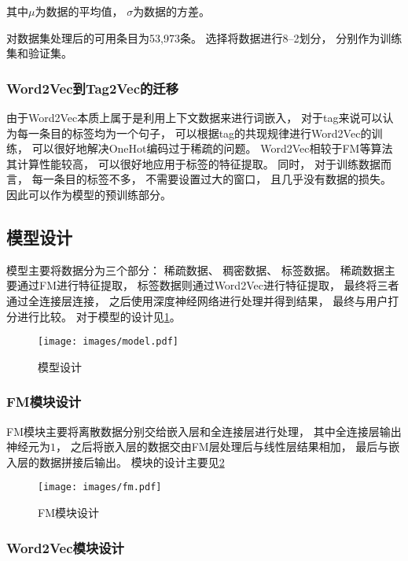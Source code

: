 其中$\mu$为数据的平均值，
$\sigma$为数据的方差。

对数据集处理后的可用条目为53,973条。
选择将数据进行8--2划分，
分别作为训练集和验证集。

\subsubsection{Word2Vec到Tag2Vec的迁移}

由于Word2Vec本质上属于是利用上下文数据来进行词嵌入，
对于tag来说可以认为每一条目的标签均为一个句子，
可以根据tag的共现规律进行Word2Vec的训练，
可以很好地解决OneHot编码过于稀疏的问题。
Word2Vec相较于FM等算法其计算性能较高，
可以很好地应用于标签的特征提取。
同时，
对于训练数据而言，
每一条目的标签不多，
不需要设置过大的窗口，
且几乎没有数据的损失。
因此可以作为模型的预训练部分。

\subsection{模型设计}

模型主要将数据分为三个部分：
稀疏数据、
稠密数据、
标签数据。
稀疏数据主要通过FM进行特征提取，
标签数据则通过Word2Vec进行特征提取，
最终将三者通过全连接层连接，
之后使用深度神经网络进行处理并得到结果，
最终与用户打分进行比较。
对于模型的设计见\cref{fig:model}。

\begin{figure}[!htbp]
	\centering
	\texttt{[image: images/model.pdf]}
	\caption{模型设计}\label{fig:model}
\end{figure}

\subsubsection{FM模块设计}

FM模块主要将离散数据分别交给嵌入层和全连接层进行处理，
其中全连接层输出神经元为$1$，
之后将嵌入层的数据交由FM层处理后与线性层结果相加，
最后与嵌入层的数据拼接后输出。
模块的设计主要见\cref{fig:fm}

\begin{figure}[!htbp]
	\centering
	\texttt{[image: images/fm.pdf]}
	\caption{FM模块设计}\label{fig:fm}
\end{figure}

\subsubsection{Word2Vec模块设计}

